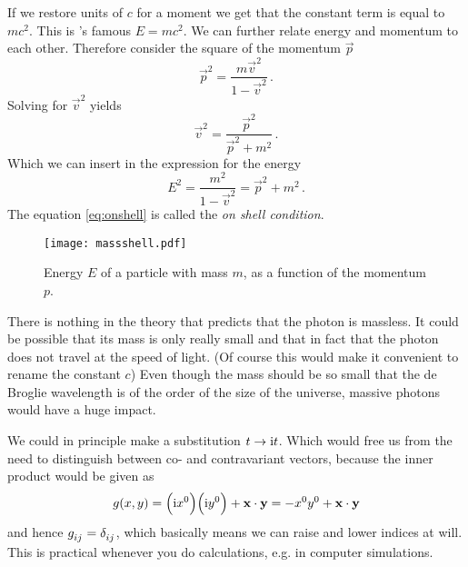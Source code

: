 If we restore units of $c$ for a moment we get that the constant term is
equal to $mc^2$. This is 's famous $E=mc^2$.
We can further relate energy and momentum to each other. Therefore consider the
square of the momentum $\vec{p}$
\begin{equation}
    \vec{p}^2=\frac{m\vec{v}^2}{1-\vec{v}^2}\, .
\end{equation}
Solving for $\vec{v}^2$ yields
\begin{equation}
    \vec{v}^2=\frac{\vec{p}^2}{\vec{p}^2+m^2}\, .
\end{equation}
Which we can insert in the expression for the energy
\begin{equation}
    E^2=\frac{m^2}{1-\vec{v}^2}=\vec{p}^2+m^2 \label{eq:onshell}\, .
\end{equation}
The equation \eqref{eq:onshell} is called the \emph{on shell condition}.
\begin{figure}[hbtp!]
\centering
 \texttt{[image: massshell.pdf]}
\caption{Energy $E$ of a particle with mass $m$, as a function of the momentum
$p$.}
\end{figure}


\begin{sidenote}
There is nothing in the theory that predicts that the photon is massless. It
could be possible that its mass is only really small and that in fact that the
photon does not travel at the speed of light. (Of course this would make it
convenient to rename the constant $c$) Even though the mass should be so small
that the de Broglie wavelength is of the order of the size of the universe,
massive photons would have a huge impact.
\end{sidenote}
\begin{sidenote}
We could in principle make a substitution $t\to \mathrm{i} t$. Which would free us
from the need to distinguish between co- and contravariant vectors, because the
inner product would be given as
\begin{equation}
    g(x,y)=\left(\imI x^0\right)\left(\imI
    y^0\right)+\vec{x}\cdot\vec{y}=-x^0y^0+\vec{x}\cdot\vec{y}
\end{equation}
and hence $\tensor{g}{_i_j}=\tensor{\delta}{_i_j}$, which basically means we can
raise and lower indices at will. This is practical whenever you do calculations,
e.g. in computer simulations.
\end{sidenote}
